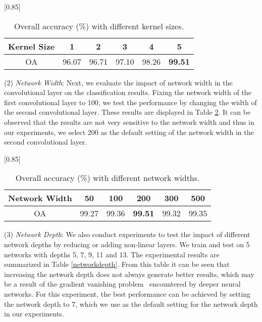 \documentclass[journal]{IEEEtran}
\begin{document}
		\begin{table}[htp]
			\caption{\label{kernelsize} {{Overall accuracy (\%) with different kernel sizes.}}}
			\begin{center}
				{\normalsize
					\scalebox{0.85}[0.85]
					{
						\begin{tabular}{|c|c|c|c|c|c|}
							\hline
							Kernel Size & 1      & 2     & 3     & 4     &  5 \\
							\hline
							OA      & 96.07  & 96.71 & 97.10 & 98.26 & \bf{99.51} \\
							\hline
						\end{tabular}
					}
				}
			\end{center}
		\end{table}
		
		
		(2) \textit{Network Width}: Next, we evaluate the impact of network width in the convolutional layer on the {{classification}} results. Fixing the network width of the first convolutional layer to 100, we test the performance by changing the width of the second convolutional layer. These results are displayed in Table \ref{networkwidth}. It can be observed that the results are not very sensitive to the network width and thus in our experiments, we select 200 as the default setting of the network width in the second convolutional layer.
		
		\begin{table}[htp]
			\caption{\label{networkwidth} {{Overall accuracy (\%) with different network widths.}}}
			\begin{center}
				{\normalsize
					\scalebox{0.85}[0.85]
					{
						\begin{tabular}{|c|c|c|c|c|c|}
							\hline
							Network Width  & 50    & 100    & 200    & 300   &  500 \\
							\hline
							OA            & 99.27  & 99.36  & \bf{99.51}  & 99.32 &  99.35 \\
							\hline
						\end{tabular}
					}
				}
			\end{center}
		\end{table}
		
		
		(3) \textit{Network Depth}: We also conduct experiments to test the impact of different network depths by reducing or adding non-linear layers. We train and test on 5 networks with depths 5, 7, 9, 11 and 13. The experimental results are summarized in Table \ref{networkdepth}. From this table it can be seen that increasing the network depth does not always generate better results, which may be a result of the gradient vanishing problem~\cite{hochreiter1998vanishing} encountered by deeper neural networks. For this experiment, the best performance can be achieved by setting the network depth to 7, which we use as the default setting for the network depth in our experiments.
		
\end{document}
